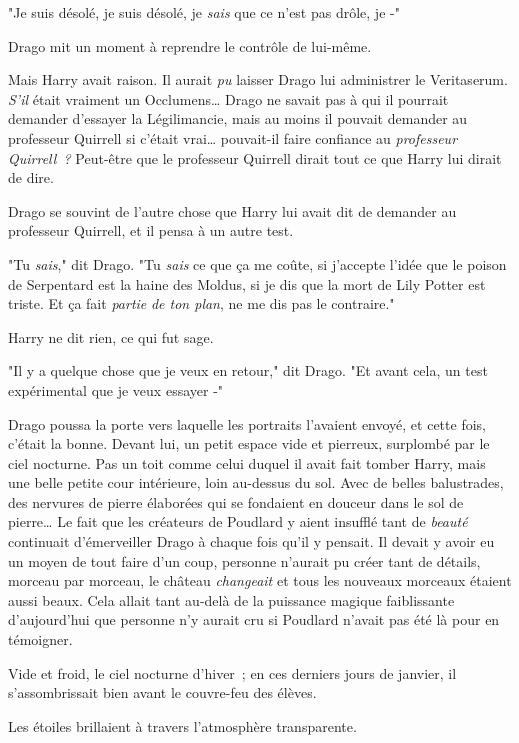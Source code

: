 "Je suis désolé, je suis désolé, je \emph{sais} que ce n'est pas drôle, je -"

Drago mit un moment à reprendre le contrôle de lui-même.

Mais Harry avait raison. Il aurait \emph{pu} laisser Drago lui administrer le Veritaserum. \emph{S'il} était vraiment un Occlumens… Drago ne savait pas à qui il pourrait demander d'essayer la Légilimancie, mais au moins il pouvait demander au professeur Quirrell si c'était vrai… pouvait-il faire confiance au \emph{professeur Quirrell~?} Peut-être que le professeur Quirrell dirait tout ce que Harry lui dirait de dire.

Drago se souvint de l'autre chose que Harry lui avait dit de demander au professeur Quirrell, et il pensa à un autre test.

"Tu \emph{sais}," dit Drago. "Tu \emph{sais} ce que ça me coûte, si j'accepte l'idée que le poison de Serpentard est la haine des Moldus, si je dis que la mort de Lily Potter est triste. Et ça fait \emph{partie} \emph{de ton plan}, ne me dis pas le contraire."

Harry ne dit rien, ce qui fut sage.

"Il y a quelque chose que je veux en retour," dit Drago. "Et avant cela, un test expérimental que je veux essayer -"

\later

Drago poussa la porte vers laquelle les portraits l'avaient envoyé, et cette fois, c'était la bonne. Devant lui, un petit espace vide et pierreux, surplombé par le ciel nocturne. Pas un toit comme celui duquel il avait fait tomber Harry, mais une belle petite cour intérieure, loin au-dessus du sol. Avec de belles balustrades, des nervures de pierre élaborées qui se fondaient en douceur dans le sol de pierre… Le fait que les créateurs de Poudlard y aient insufflé tant de \emph{beauté} continuait d'émerveiller Drago à chaque fois qu'il y pensait. Il devait y avoir eu un moyen de tout faire d'un coup, personne n'aurait pu créer tant de détails, morceau par morceau, le château \emph{changeait} et tous les nouveaux morceaux étaient aussi beaux. Cela allait tant au-delà de la puissance magique faiblissante d'aujourd'hui que personne n'y aurait cru si Poudlard n'avait pas été là pour en témoigner.

Vide et froid, le ciel nocturne d'hiver~; en ces derniers jours de janvier, il s'assombrissait bien avant le couvre-feu des élèves.

Les étoiles brillaient à travers l'atmosphère transparente.

